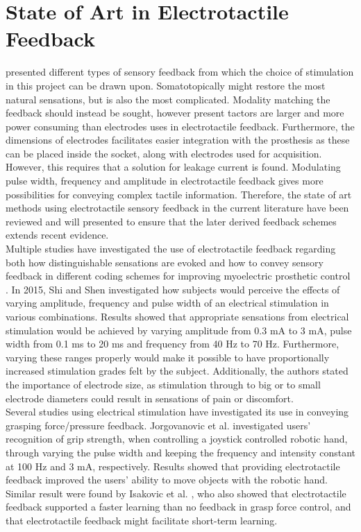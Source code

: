 \section{State of Art in Electrotactile Feedback} \label{SoA}

 presented different types of sensory feedback from which the choice of stimulation in this project can be drawn upon. Somatotopically might restore the most natural sensations, but is also the most complicated. Modality matching the feedback should instead be sought, however present tactors are larger and more power consuming than electrodes uses in electrotactile feedback. Furthermore, the dimensions of electrodes facilitates easier integration with the prosthesis as these can be placed inside the socket, along with electrodes used for acquisition. However, this requires that a solution for leakage current is found. Modulating pulse width, frequency and amplitude in electrotactile feedback gives more possibilities for conveying complex tactile information. Therefore, the state of art methods using electrotactile sensory feedback in the current literature have been reviewed and will presented to ensure that the later derived feedback schemes extends recent evidence. \\
Multiple studies have investigated the use of electrotactile feedback regarding both how distinguishable sensations are evoked and how to convey sensory feedback in different coding schemes for improving myoelectric prosthetic control \cite{Stephens-Fripp2018}. 
In 2015, Shi and Shen \cite{Shi2015} investigated how subjects would perceive the effects of varying amplitude, frequency and pulse width of an electrical stimulation in various combinations. Results showed that appropriate sensations from electrical stimulation would be achieved by varying amplitude from 0.3 mA to 3 mA, pulse width from 0.1 ms to 20 ms and frequency from 40 Hz to 70 Hz. Furthermore, varying these ranges properly would make it possible to have proportionally increased stimulation grades felt by the subject. Additionally, the authors stated the importance of electrode size, as stimulation through to big or to small electrode diameters could result in sensations of pain or discomfort. \cite{Shi2015} \\         
Several studies \cite{Pamungkas2015,Xu2016,Jorgovanovic2014,Isakovic2016} using electrical stimulation have investigated its use in conveying grasping force/pressure feedback. Jorgovanovic et al.\cite{Jorgovanovic2014} investigated users' recognition of grip strength, when controlling a joystick controlled robotic hand, through varying the pulse width and keeping the frequency and intensity constant at 100 Hz and 3 mA, respectively. Results showed that providing electrotactile feedback improved the users' ability to move objects with the robotic hand. \cite{Jorgovanovic2014} Similar result were found by Isakovic et al. \cite{Isakovic2016}, who also showed that electrotactile feedback supported a faster learning than no feedback in grasp force control, and that electrotactile feedback might facilitate short-term learning. \\ 
